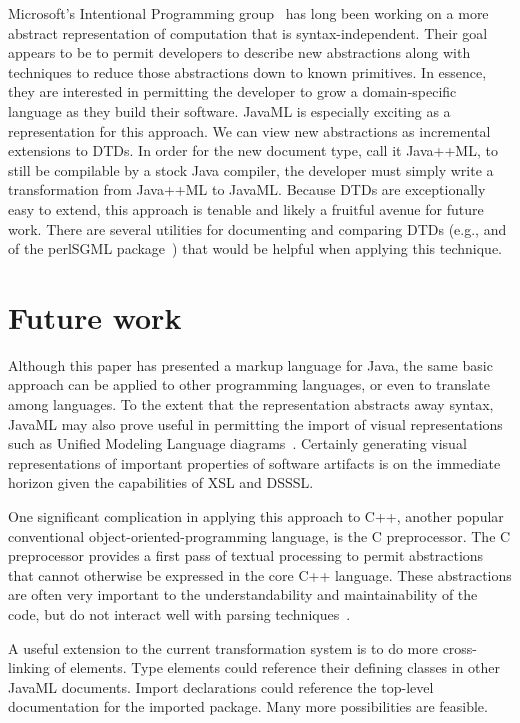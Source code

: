 \documentclass{article}
\begin{document}
\begin{multicols}{2}
Microsoft's Intentional Programming group~\cite{Simonyi96} has long been
working on a more abstract representation of computation that is
syntax-independent.  Their goal appears to be to permit developers to
describe new abstractions along with techniques to reduce those
abstractions down to known primitives.  In essence, they are interested
in permitting the developer to grow a domain-specific language as they
build their software.  JavaML is especially exciting as a representation
for this approach.  We can view new abstractions as incremental
extensions to DTDs.  In order for the new document type, call it
Java++ML, to still be compilable by a stock Java compiler, the developer
must simply write a transformation from Java++ML to JavaML.  Because
DTDs are exceptionally easy to extend, this approach is tenable and
likely a fruitful avenue for future work.  There are several utilities
for documenting and comparing DTDs (e.g.,  and
 of the perlSGML package~\cite{perlSGML}) that would
be helpful when applying this technique.



\section{Future work}
\label{sec-future}

Although this paper has presented a markup language for Java, the same
basic approach can be applied to other programming languages, or even to
translate among languages.  To the extent that the representation
abstracts away syntax, JavaML may also prove useful in permitting the
import of visual representations such as Unified Modeling Language
diagrams~\cite{UMLNutshell,XMI}.  Certainly generating visual
representations of important properties of software artifacts is on the
immediate horizon given the capabilities of XSL and DSSSL.

One significant complication in applying this approach to C++, another
popular conventional object-oriented-programming language, is the C
preprocessor.  The C preprocessor provides a first pass of textual
processing to permit abstractions that cannot otherwise be expressed in
the core C++ language.  These abstractions are often very important to
the understandability and maintainability of the code, but do not
interact well with parsing techniques~\cite{ErnstBadrosNotkin00,Badros00-spe}.

A useful extension to the current transformation system is to do
more cross-linking of elements.  Type elements could reference their
defining classes in other JavaML documents.  Import declarations could
reference the top-level documentation for the imported package.  Many
more possibilities are feasible.


\end{multicols}
\end{document}
